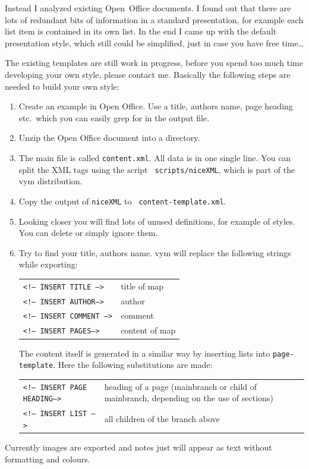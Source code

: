 \documentclass[12pt,a4paper]{article}
\newcommand{\vym}{{\sc vym }}
\begin{document}
\begin{appendix}
Instead I analyzed existing Open~Office documents. I found out that
there are lots of redundant bits of information in a standard
presentation, for example each list item is contained in its own list.
In the end I came up with the default presentation style, which still
could be simplified, just in case you have free time\ldots

The existing templates are still work in progress, before you spend too
much time developing your own style, please contact me.  Basically the
following steps are needed to build your own style:
\begin{enumerate}
    \item Create an example in Open Office. Use a title, authors name,
    page heading etc.\ which you can easily grep for in the output file.
    
    \item Unzip  the Open Office document into a directory.

    \item The main file is called {\tt content.xml}. All data is in one
    single line. You can split the XML tags using the script {\tt
    scripts/niceXML}, which is part of the \vym distribution.

    \item Copy the output of {\tt niceXML} to {\tt
    content-template.xml}.

    \item Looking closer you will find lots of unused definitions, for
    example of styles. You can delete or simply ignore them.

    \item Try to find your title, authors name. \vym will replace the
    following strings while exporting:
    \begin{center}
    \begin{tabular}{lp{4cm}}
        {\tt <!-- INSERT TITLE -->}     & title of map \\
        {\tt <!-- INSERT AUTHOR-->  }   & author \\
        {\tt <!-- INSERT COMMENT -->}   & comment \\
        {\tt <!-- INSERT PAGES-->}      & content of map \\
    \end{tabular}
    \end{center}
    The content itself is generated in a similar way by inserting lists
    into {\tt page-template}. Here the following substitutions are made:
    \begin{center}
    \begin{tabular}{lp{7cm}}
        {\tt <!-- INSERT PAGE HEADING-->}       & heading of a page
        (mainbranch or child of mainbranch, depending on the use of
        sections) \\
        {\tt <!-- INSERT LIST -->   }   & all children of the branch above \\
    \end{tabular}
    \end{center}
\end{enumerate}
Currently images are exported and notes just will appear as text
without formatting and colours.


\end{appendix}
\end{document}

